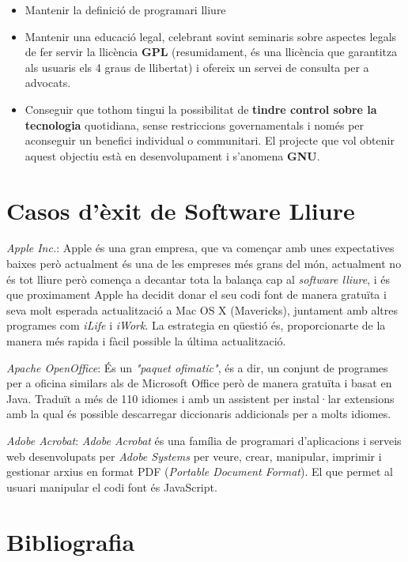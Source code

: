 	\begin{itemize}
	\item Mantenir la definició de programari lliure
	\item Mantenir una educació legal, celebrant sovint seminaris sobre aspectes legals de fer servir la 		llicència \textbf{GPL} (resumidament, és una llicència que garantitza als usuaris els 4 graus de 		llibertat) i ofereix un servei de consulta per a advocats.
	\item Conseguir que tothom tingui la possibilitat de \textbf{tindre control sobre la tecnologia} 		quotidiana, sense restriccions governamentals i només per aconseguir un benefici individual o 		communitari. El projecte que vol obtenir aquest objectiu està en desenvolupament i s'anomena 		\textbf{GNU}.
	\end{itemize}

\section{Casos d'èxit de Software Lliure}
	\emph{Apple Inc.}: Apple és una gran empresa, que va començar amb unes expectatives baixes però 		actualment és una de les empreses més grans del món, actualment no és tot lliure però comença a 	decantar tota la balança cap al \emph{software lliure}, i és que proximament Apple ha decidit 		donar el seu codi font de manera gratuïta i seva molt esperada actualització a Mac OS X (Mavericks), 		juntament amb altres programes com \emph{iLife} i \emph{iWork}. La estrategia en qüestió és, 		proporcionarte de la manera més rapida i fàcil possible la última actualització.

	\emph{Apache OpenOffice}: És un \emph{"paquet ofimatic"}, és a dir, un conjunt de programes per 		a oficina similars als de Microsoft Office però de manera gratuïta i basat en Java. Traduït a més de 		110 idiomes i amb un assistent per instal·lar extensions amb la qual és possible descarregar 		diccionaris addicionals per a molts idiomes.

	\emph{Adobe Acrobat}: \emph{Adobe Acrobat} és una família de programari d'aplicacions i serveis 		web desenvolupats per \emph{Adobe Systems} per veure, crear, manipular, imprimir i gestionar arxius en 		format PDF (\emph{Portable Document Format}). El que permet al usuari manipular el codi font és 	JavaScript.
	

\section{Bibliografia}

